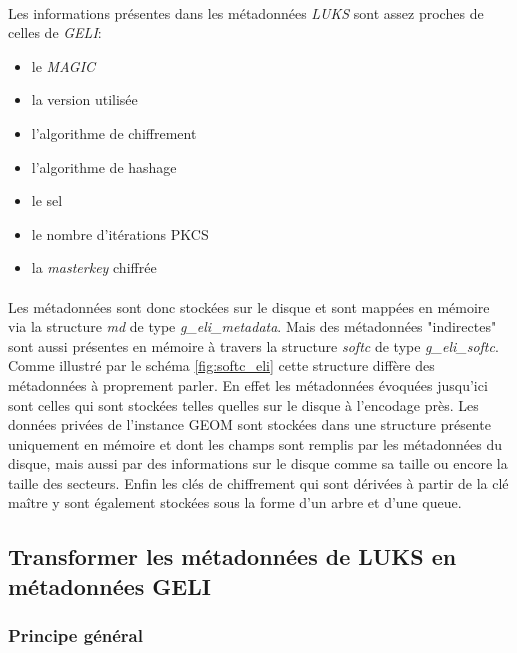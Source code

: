\paragraph{}
Les informations présentes dans les métadonnées \textit{LUKS} sont assez proches
de celles de \textit{GELI}:
\begin{itemize}
\item le \textit{MAGIC}
\item la version utilisée
\item l'algorithme de chiffrement
\item l'algorithme de hashage
\item le sel
\item le nombre d'itérations PKCS
\item la \textit{masterkey} chiffrée
\end{itemize}

\paragraph{}
Les métadonnées sont donc stockées sur le disque et sont mappées en mémoire via
la structure {\em md} de type {\em g\_eli\_metadata}. Mais des métadonnées 
"indirectes" sont aussi présentes en mémoire à travers la structure {\em softc} 
de type {\em g\_eli\_softc}. Comme illustré par le schéma \ref{fig:softc_eli} 
cette structure diffère des 
métadonnées à proprement parler. En effet les métadonnées évoquées jusqu'ici sont
celles qui sont stockées telles quelles sur le disque à l'encodage près. Les 
données privées de l'instance GEOM sont stockées dans une structure présente 
uniquement en mémoire et dont les champs sont remplis par les métadonnées du 
disque, mais aussi par des informations sur le disque comme sa taille ou encore 
la taille des secteurs. Enfin les clés de chiffrement qui sont dérivées à partir
de la clé maître y sont également stockées sous la forme d'un arbre et d'une 
queue.

\subsection{Transformer les métadonnées de LUKS en métadonnées GELI}
\subsubsection{Principe général}
